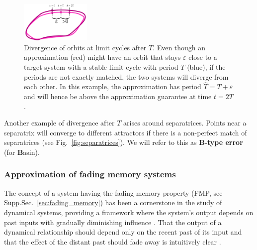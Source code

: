 \documentclass{article}
\theoremstyle{definition} \newtheorem{definition}{Definition}
\theoremstyle{remark} \newtheorem{remark}{Remark}
\newcounter{ct}
\begin{document}
\setlength\belowcaptionskip{-5ex}
\begin{figure}
  \centering
  \includegraphics[width=0.3\textwidth]{lc_period_div}
  \caption{Divergence of orbits at limit cycles after $T$.
  Even though an approximation (red) might have an orbit that stays $\varepsilon$ close to a target system with a stable limit cycle with period $T$ (blue), if the periods are not exactly matched, the two systems will diverge from each other.
  In this example, the approximation has period $\hat{T} = T+\varepsilon$ and will hence be above the approximation guarantee at time $t=2T$.
  }\label{fig:lc_period_div}
\end{figure}

Another example of divergence after $T$ arises around separatrices.
Points near a separatrix will converge to different attractors if there is a non-perfect match of separatrices (see Fig.~\ref{fig:separatrices}).
We will refer to this as \textbf{B-type error} (for \textbf{B}asin).



\subsubsection{Approximation of fading memory systems}\label{sec:fadingmemory}
The concept of a system having the fading memory property (FMP, see Supp.Sec.~\ref{sec:fading_memory}) has been a cornerstone in the study of dynamical systems\citep{coleman1968general}, providing a framework where the system’s output depends on past inputs with gradually diminishing influence \citep{boyd1985fading}.
That the output of a dynamical relationship should depend only on the recent past of its input and that the effect of the distant past should fade away is intuitively clear  \citep{sepulchre2021fading}.
\end{document}

